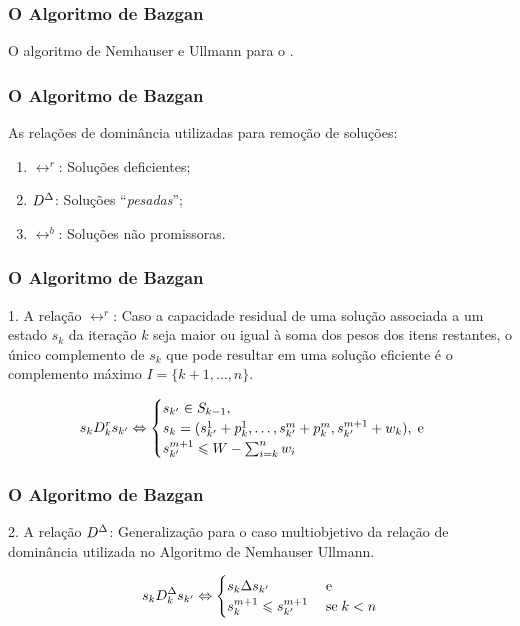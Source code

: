 \documentclass[10pt,xcolor=table,fleqn]{beamer}
\begin{document}
\begin{frame}
	\frametitle{O Algoritmo de Bazgan}
  \begin{algorithm}[H]
    \footnotesize
    
    \caption{O algoritmo de Nemhauser e Ullmann para o \mokp.}
  \end{algorithm}
\end{frame}

\begin{frame}
	\frametitle{O Algoritmo de Bazgan}
  As relações de dominância utilizadas para remoção de soluções: \pause
  \begin{enumerate}
    \item{ $\rel^r$: Soluções deficientes;} \pause
    \item{ $D^{\Delta}$: Soluções ``\textit{pesadas}'';} \pause
    \item{ $\rel^{b}$: Soluções não promissoras.}
  \end{enumerate}
\end{frame}

\begin{frame}
	\frametitle{O Algoritmo de Bazgan}
  \begin{block}{1. A relação $\rel^r$:}
    Caso a capacidade residual de uma solução associada a um estado $s_k$
    da iteração $k$ seja maior ou igual à soma dos pesos dos itens restantes,
    o único complemento de $s_k$ que pode resultar
    em uma solução eficiente é o complemento máximo $I = \{k+1, \ldots, n\}$.
  \end{block}
  \pause
  \begin{displaymath}
    s_k D_k^r s_{{k'}}
      \Leftrightarrow
      \begin{cases}
        s_{{k'}} \in S_{k-1}, \\
        s_k = (s_{{k'}}^1 + p_k^1, \ldots, s_{{k'}}^m + p_k^m, s_{{k'}}^{m+1} + w_k), \; \text{e} \\
        s_{{k'}}^{m+1} \leqslant W - \sum_{i=k}^n w_i
      \end{cases}
  \end{displaymath}
\end{frame}

\begin{frame}
	\frametitle{O Algoritmo de Bazgan}
  \begin{block}{2. A relação $D^{\Delta}$:}
    Generalização para o caso multiobjetivo
    da relação de dominância utilizada no Algoritmo de Nemhauser Ullmann.
  \end{block}
  \pause
  \begin{displaymath}
    s_k D_k^{\Delta} s_{{k'}}
      \Leftrightarrow
      \begin{cases}
        s_k \Delta s_{{k'}} \; & \text{e} \\
        s_k^{m+1} \leqslant s_{{k'}}^{m+1} \; & \text{se} \; k < n
      \end{cases}
  \end{displaymath}
\end{frame}
\end{document}
